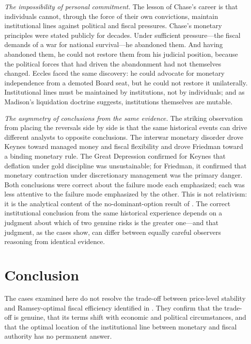 \documentclass[12pt]{article}
\begin{document}
\textit{The impossibility of personal commitment.}  The
lesson of Chase's career is that individuals cannot, through the force
of their own convictions, maintain institutional lines against political
and fiscal pressures.  Chase's monetary principles were stated publicly
for decades.  Under
sufficient pressure---the fiscal demands of a war for national
survival---he abandoned them.  And having abandoned them, he could not
restore them from his judicial position, because the political forces
that had driven the abandonment had not themselves changed.  Eccles
faced the same discovery: he could advocate for monetary independence
from a demoted Board seat, but he could not restore it unilaterally.
Institutional lines must be maintained by institutions, not by
individuals; and as Madison's liquidation doctrine suggests, institutions
themselves are mutable.

\textit{The asymmetry of conclusions from the same evidence.}  The
striking observation from placing the reversals
side by side is that the same historical events can drive different
analysts to opposite conclusions.  The interwar monetary disorder drove
Keynes toward managed money and fiscal flexibility and drove Friedman
toward a binding monetary rule.  The Great Depression confirmed for
Keynes that deflation under gold discipline was unsustainable; for
Friedman, it confirmed that monetary contraction under discretionary
management was the primary danger.  Both conclusions were correct about
the failure mode each emphasized; each was less attentive to the failure
mode emphasized by the other.  This is not relativism: it is the
analytical content of the no-dominant-option result of \citet{Sargent2011}.
The correct institutional conclusion from the same historical experience
depends on a judgment about which of two genuine risks is the greater
one---and that judgment, as the cases show, can differ between equally
careful observers reasoning from identical evidence.


\section{Conclusion}

The cases examined here do not resolve the trade-off between price-level
stability and Ramsey-optimal fiscal efficiency identified in
\citet{Sargent2011}.  They confirm that the trade-off is genuine, that
its terms shift with economic and political circumstances, and that the
optimal location of the institutional line between monetary and fiscal
authority has no permanent answer.
\end{document}
